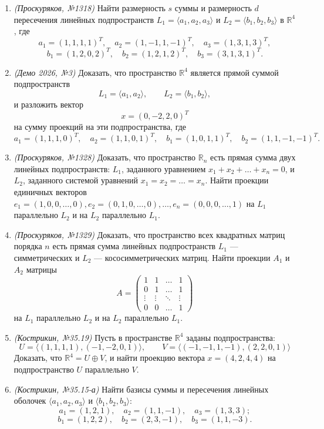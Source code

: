 \begin{enumerate}
    \item \textit{(Проскуряков, №1318)} Найти размерность $s$ суммы и размерность $d$ пересечения линейных подпространств $L_1 = \langle a_1, a_2, a_3 \rangle$ и $L_2 = \langle b_1, b_2, b_3 \rangle$ в $\mathbb{R}^4$, где
        \[
        a_1 = (1, 1, 1, 1)^T, \quad a_2 = (1, -1, 1, -1)^T, \quad a_3 = (1, 3, 1, 3)^T,
        \]
        \[
        b_1 = (1, 2, 0, 2)^T, \quad b_2 = (1, 2, 1, 2)^T, \quad b_3 = (3, 1, 3, 1)^T.
        \]

    \item \textit{(Демо 2026, №3)} Доказать, что пространство $\mathbb{R}^4$ является прямой суммой подпространств
    \[
    L_1=\langle a_1,a_2\rangle,\qquad L_2=\langle b_1,b_2\rangle,
    \]
    и разложить вектор
    \[
    x=(0,-2,2,0)^T
    \]
    на сумму проекций на эти подпространства, где
    \[
    a_1=(1,1,1,0)^T,\quad a_2=(1,1,0,1)^T,\quad
    b_1=(1,0,1,1)^T,\quad b_2=(1,1,-1,-1)^T.
    \]

    \item \textit{(Проскуряков, №1328)} Доказать, что пространство $\mathbb{R}_n$ есть прямая сумма двух линейных подпространств: $L_1$, заданного уравнением $x_1 + x_2 + \dots + x_n = 0$, и $L_2$, заданного системой уравнений $x_1 = x_2 = \dots = x_n$. Найти проекции единичных векторов $e_1 = (1, 0, 0, \dots, 0), e_2 = (0, 1, 0, \dots, 0), \dots, e_n = (0, 0, 0, \dots, 1)$ на $L_1$ параллельно $L_2$ и на $L_2$ параллельно $L_1$.

    \item \textit{(Проскуряков, №1329)} Доказать, что пространство всех квадратных матриц порядка $n$ есть прямая сумма линейных подпространств $L_1$ — симметрических и $L_2$ — кососимметрических матриц. Найти проекции $A_1$ и $A_2$ матрицы
    \[
    A = \begin{pmatrix}
    1 & 1 & \dots & 1 \\
    0 & 1 & \dots & 1 \\
    \vdots & \vdots & \ddots & \vdots \\
    0 & 0 & \dots & 1
    \end{pmatrix}
    \]
    на $L_1$ параллельно $L_2$ и на $L_2$ параллельно $L_1$.

    \item \textit{(Кострикин, №35.19)} Пусть в пространстве $\mathbb{R}^4$ заданы подпространства:
    \[
    U = \langle (1, 1, 1, 1), (-1, -2, 0, 1) \rangle, \qquad V = \langle (-1, -1, 1, -1), (2, 2, 0, 1) \rangle
    \]
    Доказать, что $\mathbb{R}^4 = U \oplus V$, и найти проекцию вектора $x = (4, 2, 4, 4)$ на подпространство $U$ параллельно $V$.

    \item \textit{(Кострикин, №35.15-а)} Найти базисы суммы и пересечения линейных оболочек $\langle a_1, a_2, a_3 \rangle$ и $\langle b_1, b_2, b_3 \rangle$:
    \[
    a_1 = (1, 2, 1), \quad a_2 = (1, 1, -1), \quad a_3 = (1, 3, 3);
    \]
    \[
    b_1 = (1, 2, 2), \quad b_2 = (2, 3, -1), \quad b_3 = (1, 1, -3).
    \]
\end{enumerate}
